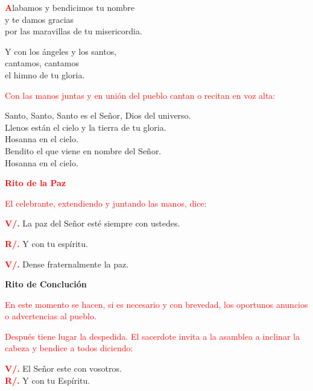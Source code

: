 \documentclass[12pt, letterpaper]{report}
\begin{document}
\lettrine[lines=2]{\bfseries \textcolor{red}{A}}{}\Large labamos y bendicimos tu nombre\\
y te damos gracias\\
por las maravillas de tu misericordia.

\noindent
\Large Y con los \'angeles y los santos,\\
cantamos, cantamos\\
el himno de tu gloria.
    
\large{\textcolor{red}{Con las manos juntas y en uni\'on del pueblo cantan o recitan en voz alta:}}

\noindent
\Large {Santo, Santo, Santo es el Se\~nor, Dios del universo.\\
Llenos est\'an el cielo y la tierra de tu gloria.\\
Hosanna en el cielo.\\
Bendito el que viene en nombre del Se\~nor.\\
Hosanna en el cielo.}

\Large {\bfseries \textcolor{red}{Rito de la Paz}}

\large {\textcolor{red}{El celebrante, extendiendo y juntando las manos, dice:}}

\noindent
\Large {\bfseries \textcolor{red}{V/.}} \hspace{0.5cm} La paz del Se\~nor est\'e siempre con ustedes.

\noindent
\Large {\bfseries \textcolor{red}{R/.}} \hspace{0.5cm} Y con tu esp\'iritu. 

\noindent
\Large {\bfseries \textcolor{red}{V/.}} \hspace{0.5cm} Dense fraternalmente la paz. 

\begin{center}
\Huge {\bfseries Rito de Concluci\'on}
\end{center}

\large{\textcolor{red}{En este momento se hacen, si es necesario y con brevedad, los oportunos anuncios o advertencias al pueblo.}}

\large{\textcolor{red}{Despu\'es tiene lugar la despedida. El sacerdote invita a la asamblea a inclinar la cabeza y bendice a todos diciendo:}}

\noindent
\Large {\bfseries \textcolor{red}{V/.}} \hspace{0.5cm} El Se\~nor este con vosotros.\\
\noindent
\Large {\bfseries \textcolor{red}{R/.}} \hspace{0.5cm} Y con tu Esp\'iritu.
\end{document}
